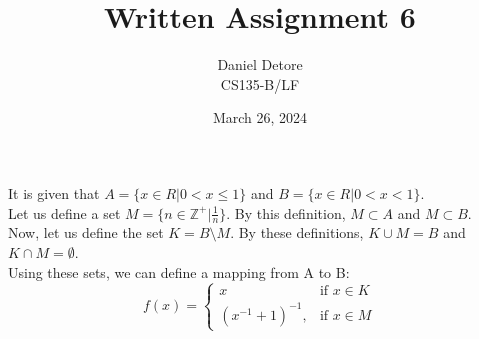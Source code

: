 \documentclass{article}
\title{Written Assignment 6}
\author{Daniel Detore\\CS135-B/LF}
\date{March 26, 2024}
\begin{document}
\maketitle
\raggedright

\section{}
It is given that $A = \{x \in R | 0 < x \leq 1\}$ and $B = \{x \in R | 0 < x < 1\}.$\\
Let us define a set $M = \{ n \in \mathbb{Z}^+ | \frac{1}{n} \}$. By this definition, $M \subset A$ and $M \subset B$. \\
Now, let us define the set $K = B \setminus M$. By these definitions, $K \cup M = B$ and $K \cap M = \emptyset$. \\
Using these sets, we can define a mapping from A to B:
\begin{equation*}
    f(x) = \begin{cases}
        x & \text{if } x \in K\\
        (x^{-1} + 1)^{-1},& \text{if } x \in M
    \end{cases}
\end{equation*}
\end{document}
